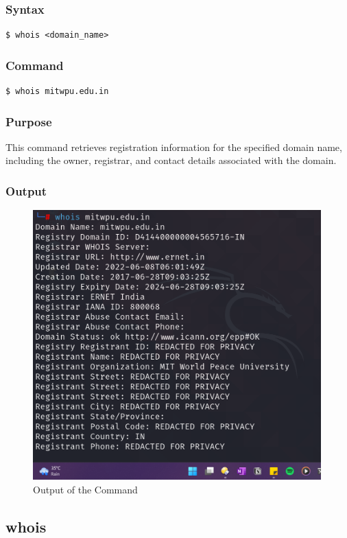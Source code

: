 \documentclass[11pt]{article}
\begin{document}
\subsubsection*{Syntax}
\begin{verbatim}
$ whois <domain_name>
\end{verbatim}

\subsubsection*{Command}
\begin{verbatim}
$ whois mitwpu.edu.in
\end{verbatim}

\subsubsection*{Purpose}
This command retrieves registration information for the specified domain name, including the owner, registrar, and contact details associated with the domain.
\subsubsection*{Output}
\begin{figure}[H]
    \centering
    \includegraphics[width=0.99\textwidth]{whois.png}
    \caption{Output of the Command}
\end{figure}
\subsection{whois}
\end{document}
